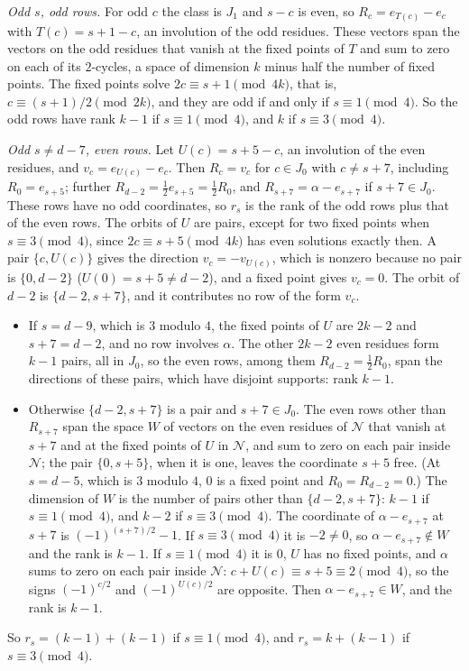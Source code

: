 \begin{informalproof}
\emph{Odd $s$, odd rows.} For odd $c$ the class is $J_1$ and $s-c$ is even, so $R_c=e_{T(c)}-e_c$ with $T(c)=s+1-c$, an
involution of the odd residues. These vectors span the vectors on the odd residues that vanish at the fixed points of
$T$ and sum to zero on each of its $2$-cycles, a space of dimension $k$ minus half the number of fixed points. The fixed
points solve $2c\equiv s+1\pmod{4k}$, that is, $c\equiv(s+1)/2\pmod{2k}$, and they are odd if and only if
$s\equiv1\pmod4$. So the odd rows have rank $k-1$ if $s\equiv1\pmod4$, and $k$ if $s\equiv3\pmod4$.

\emph{Odd $s\ne d-7$, even rows.} Let $U(c)=s+5-c$, an involution of the even residues, and $v_c=e_{U(c)}-e_c$. Then
$R_c=v_c$ for $c\in J_0$ with $c\ne s+7$, including $R_0=e_{s+5}$; further $R_{d-2}=\frac12e_{s+5}=\frac12R_0$, and
$R_{s+7}=\alpha-e_{s+7}$ if $s+7\in J_0$. These rows have no odd coordinates, so $r_s$ is the rank of the odd rows plus
that of the even rows. The orbits of $U$ are pairs, except for two fixed points when $s\equiv3\pmod4$, since
$2c\equiv s+5\pmod{4k}$ has even solutions exactly then. A pair $\{c,U(c)\}$ gives the direction $v_c=-v_{U(c)}$, which
is nonzero because no pair is $\{0,d-2\}$ ($U(0)=s+5\ne d-2$), and a fixed point gives $v_c=0$. The orbit of $d-2$ is
$\{d-2,s+7\}$, and it contributes no row of the form $v_c$.
\begin{itemize}[leftmargin=1.5em]
\item If $s=d-9$, which is $3$ modulo $4$, the fixed points of $U$ are $2k-2$ and $s+7=d-2$, and no row involves
$\alpha$. The other $2k-2$ even residues form $k-1$ pairs, all in $J_0$, so the even rows, among them
$R_{d-2}=\frac12R_0$, span the directions of these pairs, which have disjoint supports: rank $k-1$.
\item Otherwise $\{d-2,s+7\}$ is a pair and $s+7\in J_0$. The even rows other than $R_{s+7}$ span the space $W$ of
vectors on the even residues of $\mathcal N$ that vanish at $s+7$ and at the fixed points of $U$ in $\mathcal N$, and sum
to zero on each pair inside $\mathcal N$; the pair $\{0,s+5\}$, when it is one, leaves the coordinate $s+5$ free. (At
$s=d-5$, which is $3$ modulo $4$, $0$ is a fixed point and $R_0=R_{d-2}=0$.) The dimension of $W$ is the number of pairs
other than $\{d-2,s+7\}$: $k-1$ if $s\equiv1\pmod4$, and $k-2$ if $s\equiv3\pmod4$. The coordinate of
$\alpha-e_{s+7}$ at $s+7$ is $(-1)^{(s+7)/2}-1$. If $s\equiv3\pmod4$ it is $-2\ne0$, so $\alpha-e_{s+7}\notin W$ and the
rank is $k-1$. If $s\equiv1\pmod4$ it is $0$, $U$ has no fixed points, and $\alpha$ sums to zero on each pair inside
$\mathcal N$: $c+U(c)\equiv s+5\equiv2\pmod4$, so the signs $(-1)^{c/2}$ and $(-1)^{U(c)/2}$ are opposite. Then
$\alpha-e_{s+7}\in W$, and the rank is $k-1$.
\end{itemize}
So $r_s=(k-1)+(k-1)$ if $s\equiv1\pmod4$, and $r_s=k+(k-1)$ if $s\equiv3\pmod4$.


\end{informalproof}
